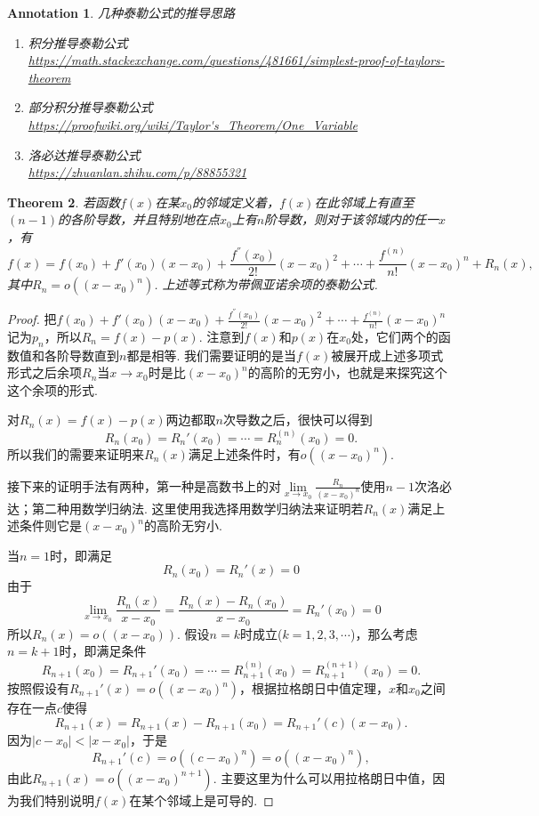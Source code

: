 \documentclass{article}
\newtheorem{theorem}{Theorem}[section]
\newtheorem{annotation}[theorem]{Annotation}
\begin{document}
\begin{annotation}
\rm 几种泰勒公式的推导思路
\begin{enumerate}
	\item 积分推导泰勒公式 \\
	\url{https://math.stackexchange.com/questions/481661/simplest-proof-of-taylors-theorem} 
	\item 部分积分推导泰勒公式 \\ 
	\url{https://proofwiki.org/wiki/Taylor's_Theorem/One_Variable}
	\item 洛必达推导泰勒公式 \\
	\url{https://zhuanlan.zhihu.com/p/88855321}
\end{enumerate} 
\end{annotation}

\begin{theorem}
\rm 若函数$f(x)$在某$x_0$的邻域定义着，$f(x)$在此邻域上有直至$(n-1)$的各阶导数，并且特别地在点$x_0$上有$n$阶导数，则对于该邻域内的任一$x$，有
$$
f(x) = f(x_0) + f'(x_0)(x-x_0) + \frac{f^{''}(x_0)}{2!}(x-x_0)^2 + \cdots + \frac{f^{(n)}}{n!}(x-x_0)^n + R_n(x),
$$
其中$R_n = o((x-x_0)^n)$. 上述等式称为{\color{red}带佩亚诺余项的泰勒公式}.
\end{theorem}

\begin{proof}
把$f(x_0) + f'(x_0)(x-x_0) + \frac{f^{''}(x_0)}{2!}(x-x_0)^2 + \cdots + \frac{f^{(n)}}{n!}(x-x_0)^n$记为$p_n$，所以$R_n = f(x) - p(x)$. 注意到$f(x)$和$p(x)$在$x_0$处，它们两个的函数值和各阶导数直到$n$都是相等. 我们需要证明的是当$f(x)$被展开成上述多项式形式之后余项$R_n$当$x \rightarrow x_0$时是比$(x-x_0)^n$的高阶的无穷小，也就是来探究这个这个余项的形式. 

对$R_n(x) = f(x) - p(x)$两边都取$n$次导数之后，很快可以得到
$$
R_n(x_0) = R_n'(x_0) = \cdots = R_n^{(n)}(x_0) = 0.
$$
所以我们的需要来证明来$R_n(x)$满足上述条件时，有$o((x-x_0)^n)$.
 
接下来的证明手法有两种，{\color{red}第一种是高数书上的对$\lim\limits_{x \rightarrow x_0} \frac{R_n}{(x-x_0)^n}$使用$n-1$次洛必达}；{\color{blue}第二种用数学归纳法}. 这里使用我选择用数学归纳法来证明若$R_n(x)$满足上述条件则它是$(x-x_0)^n$的高阶无穷小.

当$n=1$时，即满足
$$
R_n(x_0) = R_n'(x) = 0
$$
由于
$$
\lim\limits_{x \rightarrow x_0} \frac{R_n(x)}{x-x_0}= \frac{R_n(x) - R_n(x_0)}{x-x_0} = R_n'(x_0) = 0
$$
所以$R_n(x) = o((x-x_0))$. 假设$n=k$时成立($k =1,2,3,\cdots$)，那么考虑$n=k+1$时，即满足条件
$$
R_{n+1}(x_0) = R_{n+1}'(x_0) = \cdots = R_{n+1}^{(n)}(x_0) = R_{n+1}^{(n+1)}(x_0)  = 0.
$$
按照假设有$R_{n+1}'(x) = o((x-x_0)^n)$，根据拉格朗日中值定理，$x$和$x_0$之间存在一点$c$使得
$$
R_{n+1}(x) = R_{n+1}(x) - R_{n+1}(x_0) =R_{n+1}'(c)(x-x_0). 
$$
因为$|c-x_0| < |x-x_0|$，于是
$$
R_{n+1}'(c) = o((c-x_0)^n) = o((x-x_0)^n),
$$
由此$R_{n+1}(x) = o((x-x_0)^{n+1})$. 主要这里为什么可以用拉格朗日中值，因为我们特别说明$f(x)$在某个邻域上是可导的.
\end{proof}
\end{document}
